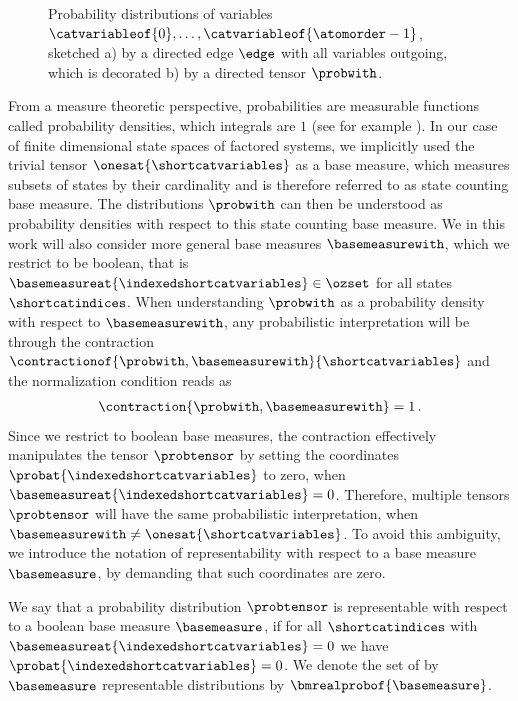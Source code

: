 \begin{figure}[t]
    \begin{center}
        
    \end{center}
    \caption{Probability distributions of variables $\catvariableof{0},\ldots,\catvariableof{\atomorder-1}$, sketched
    a) by a directed edge $\edge$ with all variables outgoing, which is decorated b) by a directed tensor $\probwith$.}\label{fig:probabilityTensor}
\end{figure}


\label{sec:baseMeasure}

From a measure theoretic perspective, probabilities are measurable functions called probability densities, which integrals are $1$ (see for example \cite{degroot_probability_2016}). %
In our case of finite dimensional state spaces of factored systems, we implicitly used the trivial tensor $\onesat{\shortcatvariables}$ as a base measure, which measures subsets of states by their cardinality and is therefore referred to as state counting base measure.
The distributions $\probwith$ can then be understood as probability densities with respect to this state counting base measure.
We in this work will also consider more general base measures $\basemeasurewith$, which we restrict to be boolean, that is $\basemeasureat{\indexedshortcatvariables}\in\ozset$ for all states $\shortcatindices$.
When understanding $\probwith$ as a probability density with respect to $\basemeasurewith$, any probabilistic interpretation will be through the contraction $\contractionof{\probwith,\basemeasurewith}{\shortcatvariables}$ and the normalization condition reads as
\begin{align*}
    \contraction{\probwith,\basemeasurewith} = 1 \, .
\end{align*}
Since we restrict to boolean base measures, the contraction effectively manipulates the tensor $\probtensor$ by setting the coordinates $\probat{\indexedshortcatvariables}$ to zero, when $\basemeasureat{\indexedshortcatvariables}=0$.
Therefore, multiple tensors $\probtensor$ will have the same probabilistic interpretation, when $\basemeasurewith\neq\onesat{\shortcatvariables}$.
To avoid this ambiguity, we introduce the notation of representability with respect to a base measure $\basemeasure$, by demanding that such coordinates are zero.

\begin{definition}
    \label{def:representationBaseMeasure}
    We say that a probability distribution $\probtensor$ is representable with respect to a boolean base measure $\basemeasure$, if for all $\shortcatindices$ with $\basemeasureat{\indexedshortcatvariables}=0$ we have $\probat{\indexedshortcatvariables}=0$.
    We denote the set of by $\basemeasure$ representable distributions by $\bmrealprobof{\basemeasure}$.
\end{definition}

